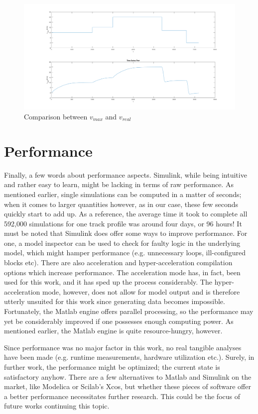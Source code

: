 \begin{figure}[htb!]
	\centering
	\includegraphics[width=\linewidth]{./pic/vmax_vs_vreal}
	\caption{Comparison between $v_{max}$ and $v_{real}$}
	\label{fig:vmaxvsvreal}
\end{figure}

\section{Performance}
\label{sec:Performance}
\par\noindent
Finally, a few words about performance aspects. Simulink, while being intuitive and rather easy to learn, might be lacking in terms of raw performance. As mentioned earlier, single simulations can be computed in a matter of seconds; when it comes to larger quantities however, as in our case, these few seconds quickly start to add up. As a reference, the average time it took to complete all 592,000 simulations for one track profile was around four days, or 96 hours! It must be noted that Simulink does offer some ways to improve performance. For one, a model inspector can be used to check for faulty logic in the underlying model, which might hamper performance (e.g. unnecessary loops, ill-configured blocks etc). There are also acceleration and hyper-acceleration compilation options which increase performance. The acceleration mode has, in fact, been used for this work, and it has sped up the process considerably. The hyper-acceleration mode, however, does not allow for model output and is therefore utterly unsuited for this work since generating data becomes impossible. Fortunately, the Matlab engine offers parallel processing, so the performance may yet be considerably improved if one possesses enough computing power. As mentioned earlier, the Matlab engine is quite resource-hungry, however. 
\par
Since performance was no major factor in this work, no real tangible analyses have been made (e.g. runtime measurements, hardware utilization etc.). Surely, in further work, the performance might be optimized; the current state is satisfactory anyhow. There are a few alternatives to Matlab and Simulink on the market, like Modelica or Scilab's Xcos, but whether these pieces of software offer a better performance necessitates further research. This could be the focus of future works continuing this topic.
